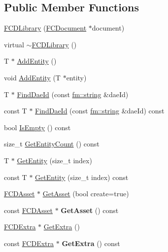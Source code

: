\subsection*{Public Member Functions}
\begin{DoxyCompactItemize}
\item 
\hyperlink{classFCDLibrary_a9cf3270dce2286c94003cabe65602bd3}{FCDLibrary} (\hyperlink{classFCDocument}{FCDocument} $\ast$document)
\item 
virtual \hyperlink{classFCDLibrary_aca8cf97f6797c52ff37422d7e7158afd}{$\sim$FCDLibrary} ()
\item 
T $\ast$ \hyperlink{classFCDLibrary_aa5cdcac5a447298d5e3816e4f8c864d0}{AddEntity} ()
\item 
void \hyperlink{classFCDLibrary_a5dba04c94673e18b2a1a2e7c8ca1eeaa}{AddEntity} (T $\ast$entity)
\item 
T $\ast$ \hyperlink{classFCDLibrary_a64376436cd35baea0992cc343138aaca}{FindDaeId} (const \hyperlink{classfm_1_1stringT}{fm::string} \&daeId)
\item 
const T $\ast$ \hyperlink{classFCDLibrary_af502e24b810e9957b820f6a7f6759b60}{FindDaeId} (const \hyperlink{classfm_1_1stringT}{fm::string} \&daeId) const 
\item 
bool \hyperlink{classFCDLibrary_a5045adb8f08e9a8f51fada3fdce63470}{IsEmpty} () const 
\item 
size\_\-t \hyperlink{classFCDLibrary_ab79bd9b55bce87bcb597a3343a94957a}{GetEntityCount} () const 
\item 
T $\ast$ \hyperlink{classFCDLibrary_ab2aa913794a0ceaafe3b3773deac3398}{GetEntity} (size\_\-t index)
\item 
const T $\ast$ \hyperlink{classFCDLibrary_a3a53f0a1500d48e935f1469f002f27ce}{GetEntity} (size\_\-t index) const 
\item 
\hyperlink{classFCDAsset}{FCDAsset} $\ast$ \hyperlink{classFCDLibrary_ab4c9390266912c40fa1d910380996f01}{GetAsset} (bool create=true)
\item 
\hypertarget{classFCDLibrary_a9c99ce7f639393804d9ce27a05f1beb6}{
const \hyperlink{classFCDAsset}{FCDAsset} $\ast$ {\bfseries GetAsset} () const }
\label{classFCDLibrary_a9c99ce7f639393804d9ce27a05f1beb6}

\item 
\hyperlink{classFCDExtra}{FCDExtra} $\ast$ \hyperlink{classFCDLibrary_ae95b2810d4f77c1c2d83d07e69d0d3a3}{GetExtra} ()
\item 
\hypertarget{classFCDLibrary_a01f67955c9edcc08876564f5ab1ad93d}{
const \hyperlink{classFCDExtra}{FCDExtra} $\ast$ {\bfseries GetExtra} () const }
\label{classFCDLibrary_a01f67955c9edcc08876564f5ab1ad93d}

\end{DoxyCompactItemize}



